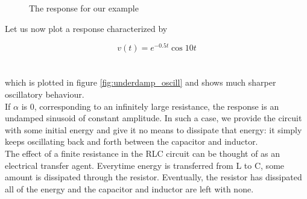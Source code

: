 \documentclass[11pt]{article}
\numberwithin{equation}{section}
\begin{document}
\begin{flushleft}
\begin{figure}[H]
  \caption{The response for our example}
  \label{fig:underdamp_plot_example}
\end{figure}%

Let us now plot a response characterized by

\begin{equation*}
v(t) = e^{-0.5t}\cos{10t}
\end{equation*}
\\~\\
which is plotted in figure \ref{fig:underdamp_oscill} and shows much sharper oscillatory behaviour.\\ If $\alpha$ is $0$, corresponding to an infinitely large resistance, the response is an undamped sinusoid of constant amplitude. In such a case, we provide the circuit with some initial
energy and give it no means to dissipate that energy: it simply keeps oscillating back and forth between the capacitor and inductor.\\
The effect of a finite resistance in the RLC circuit can be thought of as an electrical transfer agent. Everytime energy is transferred from L
to C, some amount is dissipated through the resistor. Eventually, the resistor has dissipated all of the energy and the capacitor and inductor
are left with none.


\begin{figure}[H]
	\centering
\end{figure}
\end{flushleft}
\end{document}
